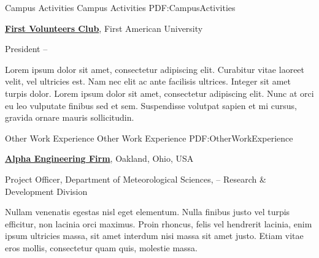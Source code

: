 \documentclass[letterpaper,MMMyyyy,nonstopmode]{simpleresumecv}
\begin{document}
\begin{Body}







\Section
{Campus Activities}
{Campus Activities}
{PDF:CampusActivities}

\Entry
\href{http://www.example.com/my-club}
{\textbf{First Volunteers Club}},
First American University

\Gap
\BulletItem
President
\hfill
{} --
\begin{Detail}
\SubBulletItem
Lorem ipsum dolor sit amet, consectetur adipiscing elit.
\SubBulletItem
Curabitur vitae laoreet velit, vel ultricies est. Nam nec elit ac ante facilisis ultrices.
\SubBulletItem
Integer sit amet turpis dolor. Lorem ipsum dolor sit amet, consectetur adipiscing elit. Nunc at orci eu leo vulputate finibus sed et sem.
\SubBulletItem
Suspendisse volutpat sapien et mi cursus, gravida ornare mauris sollicitudin.
\end{Detail}


\Section
{Other Work\newline
Experience}
{Other Work Experience}
{PDF:OtherWorkExperience}

\Entry
\href{http://www.example.com/my-company}
{\textbf{Alpha Engineering Firm}},
Oakland, Ohio, USA

\Gap
\BulletItem
Project Officer,
Department of Meteorological Sciences,
\hfill
{} --
\newline
Research \& Development Division
\begin{Detail}
\SubBulletItem
Nullam venenatis egestas nisl eget elementum.
\SubBulletItem
Nulla finibus justo vel turpis efficitur, non lacinia orci maximus. Proin rhoncus, felis vel hendrerit lacinia, enim ipsum ultricies massa, sit amet interdum nisi massa sit amet justo.
\SubBulletItem
Etiam vitae eros mollis, consectetur quam quis, molestie massa.
\end{Detail}


\end{Body}
\end{document}

